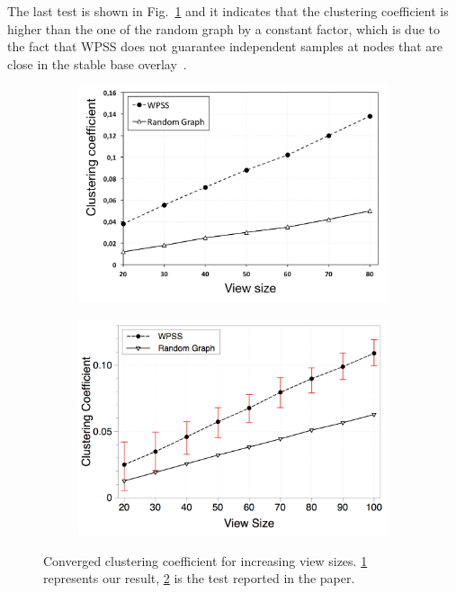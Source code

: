 The last test is shown in Fig.~\ref{fig:converged_clustering_coefficient} and it indicates that the clustering coefficient is higher than the one of the random graph by a constant factor, which is due to the fact that WPSS does not guarantee independent samples at nodes that are close in the stable base overlay~\cite{wormhole}.

\begin{figure}
\centering
\begin{subfigure}{.5\textwidth}
  \centering
  \includegraphics[keepaspectratio=true, width=1\linewidth]{images/converged_clustering_coefficient}
  \caption{}
  \label{fig:converged_clustering_coefficient}
\end{subfigure}%
\begin{subfigure}{.5\textwidth}
  \centering
  \includegraphics[keepaspectratio=true, width=1\linewidth]{images/paper_converged_clustering_coefficient}
  \caption{}
  \label{fig:paper_converged_clustering_coefficient}
\end{subfigure}
\caption{Converged clustering coefficient for increasing view sizes. \ref{fig:converged_clustering_coefficient} represents our result, \ref{fig:paper_converged_clustering_coefficient} is the test reported in the paper.}
\label{fig:randomness_conv_clustering}
\end{figure}

